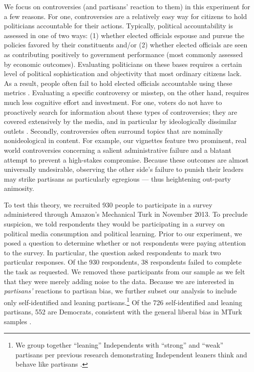\documentclass[12pt, letterpaper]{article}
\begin{document}
We focus on controversies (and partisans' reaction to them) in this experiment for a few reasons. For one, controversies are a relatively easy way for citizens to hold politicians accountable for their actions. Typically, political accountability is assessed in one of two ways:  (1) whether elected officials espouse and pursue the policies favored by their constituents and/or (2) whether elected officials are seen as contributing positively to government performance (most commonly assessed by economic outcomes). Evaluating politicians on these bases requires a certain level of political sophistication and objectivity that most ordinary citizens lack. As a result, people often fail to hold elected officials accountable using these metrics \citep[e.g.,][]{achen2016democracy,Bartels2008,healylenz_2014,Lenz2012,snidermanstiglitz_2012,soodiyengar_2014}. Evaluating a specific controversy or misstep, on the other hand, requires much less cognitive effort and investment. For one, voters do not have to proactively search for information about these types of controversies; they are covered extensively by the media, and in particular by ideologically dissimilar outlets \citep{budaketal_2016,puglisisnyder_2011}. Secondly, controversies often surround topics that are nominally nonideological in content. For example, our vignettes feature two prominent, real world controversies concerning a salient administrative failure and a blatant attempt to prevent a high-stakes compromise. Because these outcomes are almost universally undesirable, observing the other side's failure to punish their leaders may strike partisans as particularly egregious --- thus heightening out-party animosity. 

To test this theory, we recruited 930 people to participate in a survey administered through Amazon's Mechanical Turk in November 2013. To preclude suspicion, we told respondents they would be participating in a survey on political media consumption and political learning. Prior to our experiment, we posed a question to determine whether or not respondents were paying attention to the survey. In particular, the question asked respondents to mark two particular responses. Of the 930 respondents, 38 respondents failed to complete the task as requested. We removed these participants from our sample as we felt that they were merely adding noise to the data. Because we are interested in \textit{partisans'} reactions to partisan bias, we further subset our analysis to include only self-identified and leaning partisans.\footnote{We group together ``leaning'' Independents with ``strong'' and ``weak'' partisans per previous research demonstrating Independent leaners think and behave like partisans \citep{keithetal_1992}.} Of the 726 self-identified and leaning partisans, 552 are Democrats, consistent with the general liberal bias in MTurk samples \citep{BerinskyHuberLenz2012}. 
\end{document}
